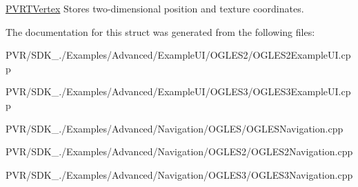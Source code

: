   \hyperlink{struct_p_v_r_t_vertex}{P\+V\+R\+T\+Vertex}  Stores two-\/dimensional position and texture coordinates. 

The documentation for this struct was generated from the following files\+:\begin{DoxyCompactItemize}
\item 
P\+V\+R/\+S\+D\+K\+\_./\+Examples/\+Advanced/\+Example\+U\+I/\+O\+G\+L\+E\+S2/O\+G\+L\+E\+S2\+Example\+U\+I.\+cpp\item 
P\+V\+R/\+S\+D\+K\+\_./\+Examples/\+Advanced/\+Example\+U\+I/\+O\+G\+L\+E\+S3/O\+G\+L\+E\+S3\+Example\+U\+I.\+cpp\item 
P\+V\+R/\+S\+D\+K\+\_./\+Examples/\+Advanced/\+Navigation/\+O\+G\+L\+E\+S/O\+G\+L\+E\+S\+Navigation.\+cpp\item 
P\+V\+R/\+S\+D\+K\+\_./\+Examples/\+Advanced/\+Navigation/\+O\+G\+L\+E\+S2/O\+G\+L\+E\+S2\+Navigation.\+cpp\item 
P\+V\+R/\+S\+D\+K\+\_./\+Examples/\+Advanced/\+Navigation/\+O\+G\+L\+E\+S3/O\+G\+L\+E\+S3\+Navigation.\+cpp\end{DoxyCompactItemize}

